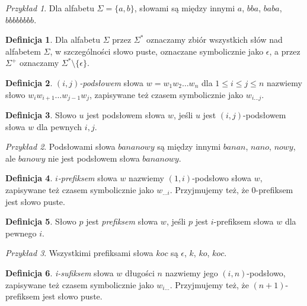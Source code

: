 \documentclass[declaration,shortabstract]{iithesis}
\theoremstyle{definition} \newtheorem{definition}{Definicja}[chapter]
\theoremstyle{remark} \newtheorem{remark}[definition]{Obserwacja}
\theoremstyle{plain} \newtheorem{theorem}[definition]{Twierdzenie}
\theoremstyle{remark} \newtheorem{example}{Przykład}[definition]
\theoremstyle{plain} \newtheorem{lemma}[definition]{Lemat}
\begin{document}
\begin{example}
    Dla alfabetu $\Sigma = \{a, b\}$, słowami są między innymi $a$, $bba$, $baba$, $bbbbbbbb$.
\end{example}

\begin{definition}
    Dla alfabetu $\Sigma$ przez $\Sigma^*$ oznaczamy zbiór wszystkich słów nad alfabetem $\Sigma$, w szczególności słowo puste, oznaczane symbolicznie jako $\epsilon$, a przez $\Sigma^+$ oznaczamy $\Sigma^* \setminus \{ \epsilon \}$.
\end{definition}

\begin{definition}
    \textit{$(i, j)$-podsłowem} słowa $w = w_1 w_2 \ldots w_{n}$ dla $1 \leq i \leq j \leq n$ nazwiemy słowo $w_i w_{i+1} \ldots w_{j-1} w_j$, zapisywane też czasem symbolicznie jako $w_{i \ldots j}$.
\end{definition}

\begin{definition}
    Słowo $u$ jest podsłowem słowa $w$, jeśli $u$ jest $(i, j)$-podsłowem słowa $w$ dla pewnych $i, j$.
\end{definition}

\begin{example}
    Podsłowami słowa $bananowy$ są między innymi $banan$, $nano$, $nowy$, ale $banowy$ nie jest podsłowem słowa $bananowy$.
\end{example}

\begin{definition}
    \textit{$i$-prefiksem} słowa $w$ nazwiemy $(1, i)$-podsłowo słowa $w$, zapisywane też czasem symbolicznie jako $w_{\ldots i}$. Przyjmujemy też, że $0$-prefiksem jest słowo puste.
\end{definition}

\begin{definition}
    Słowo $p$ jest \textit{prefiksem} słowa $w$, jeśli $p$ jest $i$-prefiksem słowa $w$ dla pewnego $i$.
\end{definition}

\begin{example}
    Wszystkimi prefiksami słowa $koc$ są $\epsilon$, $k$, $ko$, $koc$.
\end{example}

\begin{definition}
    \textit{i-sufiksem} słowa $w$ długości $n$ nazwiemy jego $(i, n)$-podsłowo, zapisywane też czasem symbolicznie jako $w_{i \ldots}$. Przyjmujemy też, że $(n+1)$-prefiksem jest słowo puste.
\end{definition}
\end{document}

